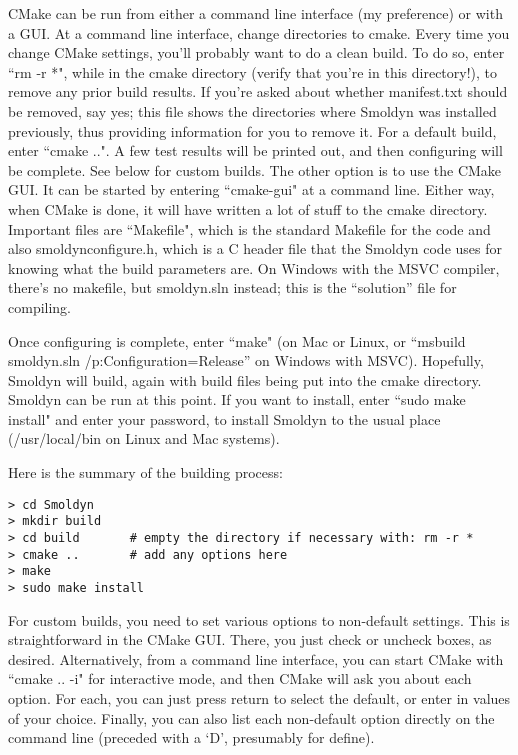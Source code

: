 \documentclass {scrbook}
\begin{document}
CMake can be run from either a command line interface (my preference) or with a GUI. At a command line interface, change directories to cmake. Every time you change CMake settings, you'll probably want to do a clean build. To do so, enter ``rm -r *", while in the cmake directory (verify that you're in this directory!), to remove any prior build results. If you're asked about whether manifest.txt should be removed, say yes; this file shows the directories where Smoldyn was installed previously, thus providing information for you to remove it. For a default build, enter ``cmake ..". A few test results will be printed out, and then configuring will be complete. See below for custom builds. The other option is to use the CMake GUI. It can be started by entering ``cmake-gui" at a command line. Either way, when CMake is done, it will have written a lot of stuff to the cmake directory. Important files are ``Makefile", which is the standard Makefile for the code and also smoldynconfigure.h, which is a C header file that the Smoldyn code uses for knowing what the build parameters are. On Windows with the MSVC compiler, there's no makefile, but smoldyn.sln instead; this is the ``solution'' file for compiling.

Once configuring is complete, enter ``make" (on Mac or Linux, or ``msbuild smoldyn.sln /p:Configuration=Release'' on Windows with MSVC). Hopefully, Smoldyn will build, again with build files being put into the cmake directory. Smoldyn can be run at this point. If you want to install, enter ``sudo make install" and enter your password, to install Smoldyn to the usual place (/usr/local/bin on Linux and Mac systems).

Here is the summary of the building process:

\begin{lstlisting}
> cd Smoldyn
> mkdir build
> cd build       # empty the directory if necessary with: rm -r *
> cmake ..	     # add any options here
> make
> sudo make install
\end{lstlisting}

For custom builds, you need to set various options to non-default settings. This is straightforward in the CMake GUI. There, you just check or uncheck boxes, as desired. Alternatively, from a command line interface, you can start CMake with ``cmake .. -i" for interactive mode, and then CMake will ask you about each option. For each, you can just press return to select the default, or enter in values of your choice. Finally, you can also list each non-default option directly on the command line (preceded with a `D', presumably for define).
\end{document}
